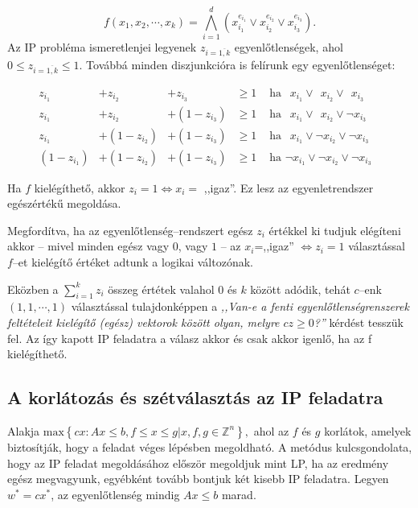 \[ f(x_1, x_2, \cdots, x_k) = \bigwedge_{i=1}^{d}{\left( x_{i_1}^{e_{i_1}} \vee 
x_{i_2}^{e_{i_2}} \vee x_{i_3}^{e_{i_3}}\right).} 
\]
Az IP probléma ismeretlenjei legyenek $z_{i=\overline{1,k}}$ egyenlőtlenségek,
ahol $0 \leq z_{i=\overline{1,k}} \leq 1$. Továbbá minden diszjunkcióra is felírunk egy
egyenlőtlenséget:


\begin{align*}
z_{i_1} &+ z_{i_2} &+      z_{i_3}  &\geq 1 & \mbox{ ha }~~x_{i_1} \vee~~x_{i_2}\vee~~x_{i_3}& \\
z_{i_1} &+ z_{i_2} &+ (1 - z_{i_3}) &\geq 1 & \mbox{ ha }~~x_{i_1} \vee~~x_{i_2} \vee \neg x_{i_3}& \\
z_{i_1} &+ (1-z_{i_2}) &+ (1 - z_{i_3})  &\geq 1 & \mbox{ ha }~~x_{i_1} \vee \neg x_{i_2} \vee\neg x_{i_3}&\\
(1-z_{i_1}) &+ (1-z_{i_2}) &+ (1 - z_{i_3})  &\geq 1 & \mbox{ ha } \neg x_{i_1} \vee \neg x_{i_2} \vee \neg x_{i_3}&
\end{align*}

Ha $f$ kielégíthető, akkor $z_i=1 \Leftrightarrow x_i=$ ,,igaz''. Ez lesz az
egyenletrendszer egészértékű megoldása. 

Megfordítva, ha az egyenlőtlenség--rendszert egész $z_i$ értékkel ki tudjuk
elégíteni akkor -- mivel minden egész vagy $0$, vagy $1$ -- az $x_i$=,,igaz''
$\Leftrightarrow z_i=1$ választással $f$--et kielégítő értéket adtunk a logikai
változónak.

Eközben a $\sum_{i=1}^{k}{z_i}$ összeg értétek valahol $0$ és $k$ között adódik,
tehát $c$--enk $(1,1,\cdots,1)$ választással tulajdonképpen a \emph{,,Van-e a fenti
egyenlőtlenségrenszerek feltételeit kielégítő (egész) vektorok között olyan,
melyre $cz \geq 0$?''} kérdést tesszük fel. Az így kapott IP feladatra a válasz
akkor és csak akkor igenlő, ha az f kielégíthető.

\subsection{A korlátozás és szétválasztás az IP feladatra}

Alakja $\mbox{max} \left\{cx:Ax \leq b, f \leq x \leq g| x,f,g \in \mathbb{Z}^n
\right\},$ ahol az $f$ és $g$ korlátok, amelyek biztosítják, hogy a feladat véges
lépésben megoldható. A metódus kulcsgondolata, hogy az IP feladat megoldásához először
megoldjuk mint LP, ha az eredmény egész megvagyunk, egyébként tovább bontjuk két kisebb
IP feladatra. Legyen $w^*=cx^*$, az egyenlőtlenség mindig $Ax \leq b$ marad.

